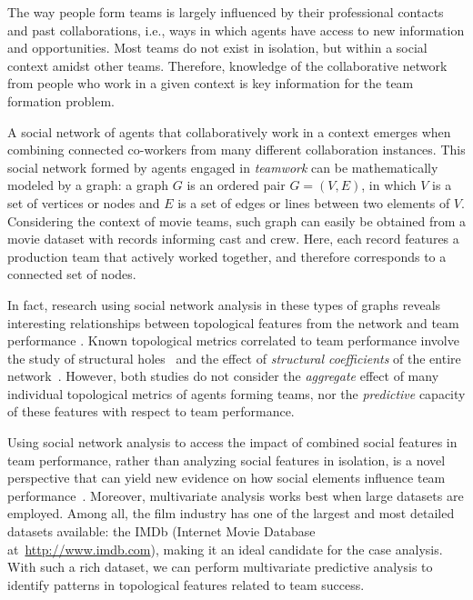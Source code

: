 The way people form teams is largely influenced by their professional contacts
and past collaborations, i.e., ways in which agents have access to new
information and opportunities. Most teams do not exist in isolation, but within
a social context amidst other teams. Therefore, knowledge of the collaborative
network from people who work in a given context is key information for the team
formation problem.

A social network of agents that collaboratively work in a context emerges when
combining connected co-workers from many different collaboration instances.
This social network formed by agents engaged in \textit{teamwork} can be
mathematically modeled by a graph: a graph $G$ is an ordered pair $G = (V, E)$,
in which $V$ is a set of vertices or nodes and $E$ is a set of edges or lines
between two elements of $V$. Considering the context of movie teams, such graph
can easily be obtained from a movie dataset with records informing cast and
crew. Here, each record features a production team that actively worked
together, and therefore corresponds to a connected set of nodes.

In fact, research using social network analysis in these types of graphs
reveals interesting relationships between topological features from the network
and team performance \citep{Burt04, grund2012network, LiLY2013,
newman2001structure, PapagelisMZ11, stokols2008, uzzi2005collaboration}. Known
topological metrics correlated to team performance involve the study of
structural holes~\citep{Burt04} and the effect of \textit{structural
coefficients} of the entire network~\citep{uzzi2005collaboration}. However,
both studies do not consider the \textit{aggregate} effect of many individual
topological metrics of agents forming teams, nor the \textit{predictive}
capacity of these features with respect to team performance.

Using social network analysis to access the impact of combined social features
in team performance, rather than analyzing social features in isolation, is a
novel perspective that can yield new evidence on how social elements influence
team performance~\citep{aggregation}. Moreover, multivariate analysis works
best when large datasets are employed. Among all, the film industry has one of
the largest and most detailed datasets available: the IMDb (Internet Movie
Database at~\url{http://www.imdb.com}), making it an ideal candidate for the
case analysis. With such a rich dataset, we can perform multivariate predictive
analysis to identify patterns in topological features related to team success.

